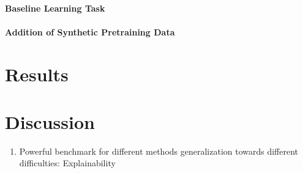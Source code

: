 \documentclass[12pt,fleqn]{article}
\begin{document}
\paragraph{Baseline Learning Task}
\paragraph{Addition of Synthetic Pretraining Data}

\section{Results}%
\label{sec:results}

\section{Discussion}%
\label{sec:disc}
\begin{enumerate}
    \item Powerful benchmark for different methods generalization towards different difficulties: Explainability
\end{enumerate}

\clearpage

\printbibliography[heading=bibintoc]
\end{document}
